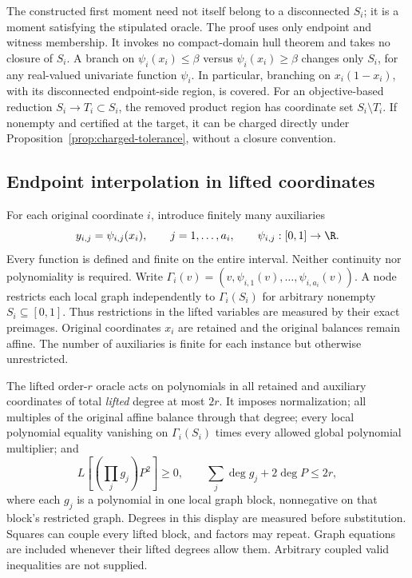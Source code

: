 The constructed first moment need not itself belong to a disconnected
$S_i$; it is a moment satisfying the stipulated oracle. The proof uses only
endpoint and witness membership. It invokes no compact-domain hull theorem
and takes no closure of $S_i$.
A branch on $\psi_i(x_i)\le\beta$ versus $\psi_i(x_i)\ge\beta$ changes
only $S_i$, for any real-valued univariate function $\psi_i$. In particular,
branching on $x_i(1-x_i)$, with its disconnected endpoint-side region,
is covered. For an objective-based reduction $S_i\to T_i\subset S_i$,
the removed product region has coordinate set $S_i\setminus T_i$.
If nonempty and certified at the target, it can be charged directly under
Proposition~\ref{prop:charged-tolerance}, without a closure convention.

\subsection{Endpoint interpolation in lifted coordinates}
For each original coordinate $i$, introduce finitely many auxiliaries
\begin{equation}\label{eq:local-graph-map}
 y_{i,j}=\psi_{i,j}(x_i),\qquad j=1,\ldots,a_i,
 \qquad \psi_{i,j}:[0,1]\to\R.
\end{equation}
Every function is defined and finite on the entire interval. Neither
continuity nor polynomiality is required. Write
$\Gamma_i(v)=(v,\psi_{i,1}(v),\ldots,\psi_{i,a_i}(v))$.
A node restricts each local graph independently to
$\Gamma_i(S_i)$ for arbitrary nonempty $S_i\subseteq[0,1]$.
Thus restrictions in the lifted variables are measured by their exact
preimages. Original coordinates $x_i$ are retained and the original
balances remain affine. The number of auxiliaries is finite for each
instance but otherwise unrestricted.

The lifted order-$r$ oracle acts on polynomials in all retained and
auxiliary coordinates of total \emph{lifted} degree at most $2r$. It
imposes normalization; all multiples of the original affine balance
through that degree; every local polynomial equality vanishing on
$\Gamma_i(S_i)$ times every allowed global polynomial multiplier; and
\begin{equation}\label{eq:lifted-local-oracle}
 L\left[\left(\prod_j g_j\right)P^2\right]\ge0,
 \qquad\sum_j\deg g_j+2\deg P\le2r,
\end{equation}
where each $g_j$ is a polynomial in one local graph block, nonnegative
on that block's restricted graph. Degrees in this display are measured
before substitution. Squares can couple every lifted block, and factors
may repeat. Graph equations are included whenever their lifted degrees
allow them. Arbitrary coupled valid inequalities are not supplied.

